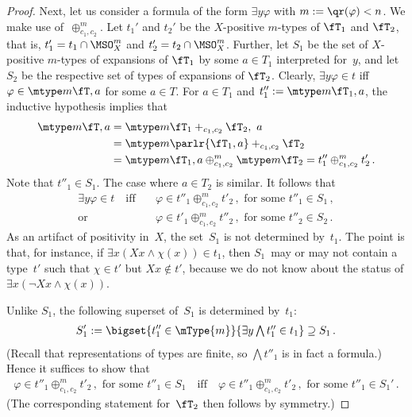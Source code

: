 \documentclass{LMCS}
\begin{document}
\begin{proof}
\smallskip
Next, let us consider a formula of the form $\exists y\varphi$
with $m := \qr(\varphi) < n$.
We make use of~$\oplus^m_{c_1,c_2}$.
Let $t_1'$ and $t_2'$ be the $X$-positive $m$-types of $\fT_1$ and $\fT_2$,
that is, $t_1' = t_1\cap\MSO^m_X$ and $t_2' = t_2\cap\MSO^m_X$.
Further, let $S_1$ be the set of $X$-positive $m$-types
of expansions of $\fT_1$ by some $a\in T_1$ interpreted for~$y$,
and let $S_2$ be the respective set of types of expansions of $\fT_2$.
Clearly, $\exists y\varphi\in t$ iff $\varphi\in\mtype m{\fT,a}$ for some $a\in T$.
For $a\in T_1$ and $t''_1:=\mtype m{\fT_1,a}$,
the inductive hypothesis implies that
\begin{align*}
  \mtype m{\fT,a}
  &= \mtype m{\fT_1+_{c_1,c_2}\fT_2,\ a} \\
  &= \mtype m{\parlr{\fT_1,a}+_{c_1,c_2}\fT_2} \\
  &= \mtype m{\fT_1,a}\oplus^m_{c_1,c_2}\mtype m{\fT_2}
   = t''_1 \oplus^m_{c_1,c_2} t'_2\,.
\end{align*}
Note that $t''_1\in S_1$.
The case where $a\in T_2$ is similar.
It follows that
\begin{align*}
  \exists y\varphi \in t
  \quad\text{iff}\quad
           & \varphi\in t''_1 \oplus^m_{c_1,c_2} t'_2\,, \text{ for some } t''_1\in S_1\,, \\
\text{or } & \varphi\in t'_1 \oplus^m_{c_1,c_2} t''_2\,, \text{ for some } t''_2\in S_2\,.
\end{align*}
As an artifact of positivity in~$X$,
the set~$S_1$ is not determined by~$t_1$.
The point is that, for instance, if
$\exists x ( Xx \wedge \chi(x)) \in t_1$,
then $S_1$~may or may not contain a type~$t'$
such that $\chi\in t'$ but $Xx\not\in t'$,
because we do not know
about the status of $\exists x(\neg Xx \wedge \chi(x))$.

Unlike $S_1$, the following superset of~$S_1$ is determined by~$t_1$\?:
\begin{align*}
  S_1' := \bigset{ t''_1 \in \mType{m} }{ \textstyle\exists y\bigwedge t''_1 \in t_1 } \supseteq S_1\,.
\end{align*}
(Recall that representations of types are finite,
so $\bigwedge t''_1$ is in fact a formula.)
Hence it suffices to show that
\begin{align*}
  \varphi\in t''_1 \oplus^m_{c_1,c_2} t'_2\,, \text{ for some } t''_1\in S_1
  \quad\text{iff}\quad
  \varphi\in t''_1 \oplus^m_{c_1,c_2} t'_2\,, \text{ for some } t''_1\in S_1'\,.
\end{align*}
(The corresponding statement for~$\fT_2$ then follows by symmetry.)


\end{proof}
\end{document}
